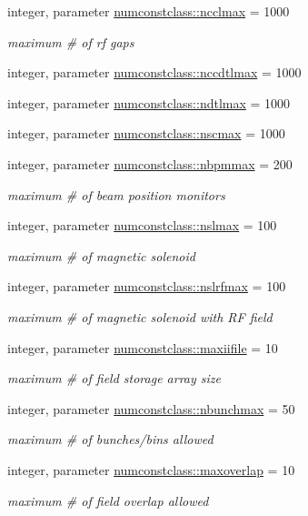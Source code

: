 \begin{DoxyCompactItemize}
integer, parameter \mbox{\hyperlink{namespacenumconstclass_ad4189a0ff5d1f4848364ea3012cddfd0}{numconstclass\+::ncclmax}} = 1000
\begin{DoxyCompactList}\small\item\em maximum \# of rf gaps \end{DoxyCompactList}\item 
integer, parameter \mbox{\hyperlink{namespacenumconstclass_a27ee6b57f509d99358609230f3ea289a}{numconstclass\+::nccdtlmax}} = 1000
\item 
integer, parameter \mbox{\hyperlink{namespacenumconstclass_a36b8673b359ee1e52cd37349ec8e51ad}{numconstclass\+::ndtlmax}} = 1000
\item 
integer, parameter \mbox{\hyperlink{namespacenumconstclass_a842fc257d326a7d9ec49e681832e6aa3}{numconstclass\+::nscmax}} = 1000
\item 
integer, parameter \mbox{\hyperlink{namespacenumconstclass_a2a11d40986bf0aa3873c57eccd9cdfac}{numconstclass\+::nbpmmax}} = 200
\begin{DoxyCompactList}\small\item\em maximum \# of beam position monitors \end{DoxyCompactList}\item 
integer, parameter \mbox{\hyperlink{namespacenumconstclass_a538bae3eec1dd1a5815019847df66e23}{numconstclass\+::nslmax}} = 100
\begin{DoxyCompactList}\small\item\em maximum \# of magnetic solenoid \end{DoxyCompactList}\item 
integer, parameter \mbox{\hyperlink{namespacenumconstclass_a454ee9bf5d3755b8cfc222eedcb9495d}{numconstclass\+::nslrfmax}} = 100
\begin{DoxyCompactList}\small\item\em maximum \# of magnetic solenoid with RF field \end{DoxyCompactList}\item 
integer, parameter \mbox{\hyperlink{namespacenumconstclass_a16c5d12ac247e813b03d87aab5e4dbcb}{numconstclass\+::maxiifile}} = 10
\begin{DoxyCompactList}\small\item\em maximum \# of field storage array size \end{DoxyCompactList}\item 
integer, parameter \mbox{\hyperlink{namespacenumconstclass_ac218e74533123f49148ceb12b1d3b16e}{numconstclass\+::nbunchmax}} = 50
\begin{DoxyCompactList}\small\item\em maximum \# of bunches/bins allowed \end{DoxyCompactList}\item 
integer, parameter \mbox{\hyperlink{namespacenumconstclass_a4b7c578c9dcac7c1d356b2aabe7c3cb6}{numconstclass\+::maxoverlap}} = 10
\begin{DoxyCompactList}\small\item\em maximum \# of field overlap allowed \end{DoxyCompactList}\end{DoxyCompactItemize}
